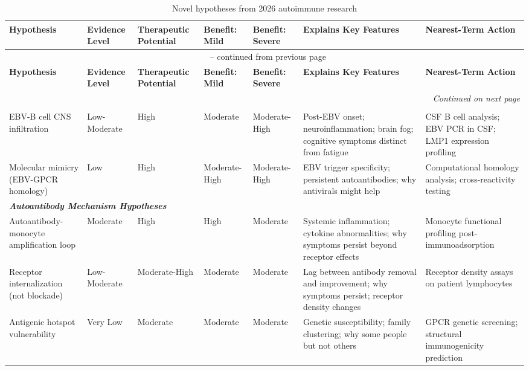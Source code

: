 \begin{landscape}
\tiny
\begin{longtable}{p{3.5cm}p{2cm}p{2cm}p{1.8cm}p{1.8cm}p{4.5cm}p{5cm}}
\caption{Novel hypotheses from 2026 autoimmune research} \label{tab:2026-autoimmune-hypotheses} \\
\toprule
\textbf{Hypothesis} & \textbf{Evidence Level} & \textbf{Therapeutic Potential} & \textbf{Benefit: Mild} & \textbf{Benefit: Severe} & \textbf{Explains Key Features} & \textbf{Nearest-Term Action} \\
\midrule
\endfirsthead
\multicolumn{7}{c}{\tablename\ \thetable{} -- continued from previous page} \\
\toprule
\textbf{Hypothesis} & \textbf{Evidence Level} & \textbf{Therapeutic Potential} & \textbf{Benefit: Mild} & \textbf{Benefit: Severe} & \textbf{Explains Key Features} & \textbf{Nearest-Term Action} \\
\midrule
\endhead
\midrule
\multicolumn{7}{r}{\textit{Continued on next page}} \\
\endfoot
\bottomrule
\endlastfoot
\multicolumn{7}{l}{\textit{\textbf{EBV-Related Hypotheses}}} \\
\midrule
EBV-B cell CNS infiltration & Low-Moderate & High & Moderate & Moderate-High & Post-EBV onset; neuroinflammation; brain fog; cognitive symptoms distinct from fatigue & CSF B cell analysis; EBV PCR in CSF; LMP1 expression profiling \\
\midrule
Molecular mimicry (EBV-GPCR homology) & Low & High & Moderate-High & Moderate-High & EBV trigger specificity; persistent autoantibodies; why antivirals might help & Computational homology analysis; cross-reactivity testing \\
\midrule
\multicolumn{7}{l}{\textit{\textbf{Autoantibody Mechanism Hypotheses}}} \\
\midrule
Autoantibody-monocyte amplification loop & Moderate & High & High & Moderate & Systemic inflammation; cytokine abnormalities; why symptoms persist beyond receptor effects & Monocyte functional profiling post-immunoadsorption \\
\midrule
Receptor internalization (not blockade) & Low-Moderate & Moderate-High & Moderate & Moderate & Lag between antibody removal and improvement; why symptoms persist; receptor density changes & Receptor density assays on patient lymphocytes \\
\midrule
Antigenic hotspot vulnerability & Very Low & Moderate & Moderate & Moderate & Genetic susceptibility; family clustering; why some people but not others & GPCR genetic screening; structural immunogenicity prediction \\

\end{longtable}
\end{landscape}
